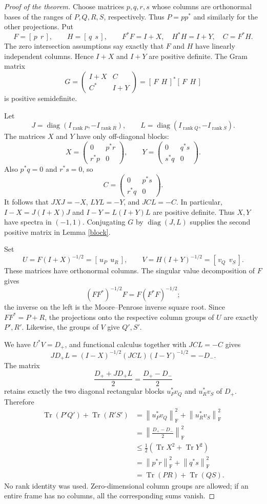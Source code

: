\documentclass[11pt]{article}
\newcommand{\Tr}{\operatorname{Tr}}
\newcommand{\rank}{\operatorname{rank}}
\newcommand{\norm}[1]{\left\|#1\right\|_{\mathrm F}}
\begin{document}
\begin{proof}[Proof of the theorem]
Choose matrices $p,q,r,s$ whose columns are orthonormal bases of
the ranges of $P,Q,R,S$, respectively. Thus $P=pp^*$ and similarly
for the other projections. Put
\[
 F=[\,p\ \ r\,],\qquad H=[\,q\ \ s\,],\qquad
 F^*F=I+X,\quad H^*H=I+Y,\quad C=F^*H.
\]
The zero intersection assumptions say exactly that $F$ and $H$ have
linearly independent columns. Hence $I+X$ and $I+Y$ are positive definite.
The Gram matrix
\[
 G=\begin{pmatrix}I+X&C\\C^*&I+Y\end{pmatrix}
   =[\,F\ \ H\,]^*[\,F\ \ H\,]
\]
is positive semidefinite.

Let
\[
 J=\operatorname{diag}(I_{\rank P},-I_{\rank R}),\qquad
 L=\operatorname{diag}(I_{\rank Q},-I_{\rank S}).
\]
The matrices $X$ and $Y$ have only off-diagonal blocks:
\[
 X=\begin{pmatrix}0&p^*r\\r^*p&0\end{pmatrix},\qquad
 Y=\begin{pmatrix}0&q^*s\\s^*q&0\end{pmatrix}.
\]
Also $p^*q=0$ and $r^*s=0$, so
\[
 C=\begin{pmatrix}0&p^*s\\r^*q&0\end{pmatrix}.
\]
It follows that $JXJ=-X$, $LYL=-Y$, and $JCL=-C$. In particular,
$I-X=J(I+X)J$ and $I-Y=L(I+Y)L$ are positive definite. Thus $X,Y$
have spectra in $(-1,1)$. Conjugating $G$ by
$\operatorname{diag}(J,L)$ supplies the second positive matrix in
Lemma \ref{block}.

Set
\[
 U=F(I+X)^{-1/2}=[\,u_P\ \ u_R\,],\qquad
 V=H(I+Y)^{-1/2}=[\,v_Q\ \ v_S\,].
\]
These matrices have orthonormal columns. The singular value decomposition
of $F$ gives
\[
 (FF^*)^{-1/2}F=F(F^*F)^{-1/2};
\]
the inverse on the left is the Moore--Penrose inverse square root.
Since $FF^*=P+R$, the projections onto the respective column groups of
$U$ are exactly $P',R'$. Likewise, the groups of $V$ give $Q',S'$.

We have $U^*V=D_+$, and functional calculus together with $JCL=-C$
gives
\[
 JD_+L
 =(I-X)^{-1/2}(JCL)(I-Y)^{-1/2}
 =-D_-.
\]
The matrix
\[
 \frac{D_++JD_+L}{2}=\frac{D_+-D_-}{2}
\]
retains exactly the two diagonal rectangular blocks $u_P^*v_Q$ and
$u_R^*v_S$ of $D_+$. Therefore
\[
\begin{aligned}
 \Tr(P'Q')+\Tr(R'S')
 &=\norm{u_P^*v_Q}^2+\norm{u_R^*v_S}^2\\
 &=\norm{\frac{D_+-D_-}{2}}^2\\
 &\leq\frac12(\Tr X^2+\Tr Y^2)\\
 &=\norm{p^*r}^2+\norm{q^*s}^2\\
 &=\Tr(PR)+\Tr(QS).
\end{aligned}
\]
No rank identity was used. Zero-dimensional column groups are allowed;
if an entire frame has no columns, all the corresponding sums vanish.
\end{proof}
\end{document}
